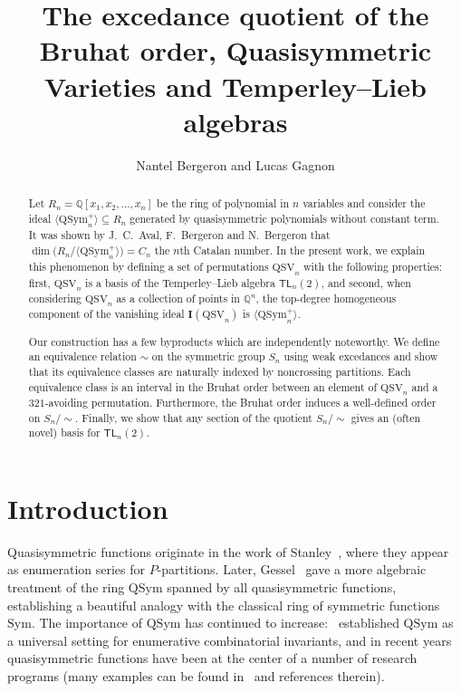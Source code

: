 \documentclass[12pt]{amsart}
\title{The excedance quotient of the Bruhat order, Quasisymmetric Varieties and Temperley--Lieb algebras}
\author{ Nantel Bergeron and Lucas Gagnon}
\date{}
\theoremstyle{definition}
\theoremstyle{remark}
\numberwithin{equation}{section}
\newcommand{\Sym}{\mathrm{Sym}}
\newcommand{\QSym}{\mathrm{QSym}}
\newcommand{\QSV}{\mathrm{QSV}}
\begin{document}
\maketitle
\begin{abstract} 
Let $R_n=\mathbb{Q}[x_1,x_2,\ldots,x_n]$ be the ring of polynomial in $n$ variables and consider the ideal $\langle \mathrm{QSym}_{n}^{+}\rangle\subseteq R_n$ generated by quasisymmetric polynomials without constant term. 
It was shown by J.~C.~Aval, F.~Bergeron and  N.~Bergeron that $\dim\big(R_n\big/\langle \mathrm{QSym}_{n}^{+} \rangle\big)=C_n$ the $n$th Catalan number. 
In the present work, we explain this phenomenon by defining a set of permutations $\mathrm{QSV}_{n}$ with the following properties: first, $\mathrm{QSV}_{n}$ is a basis of the Temperley--Lieb algebra $\mathsf{TL}_{n}(2)$, and second, when considering $\mathrm{QSV}_{n}$ as a collection of points in $\mathbb{Q}^{n}$, the top-degree homogeneous component of the vanishing ideal $\mathbf{I}(\mathrm{QSV}_{n})$ is $\langle \mathrm{QSym}_{n}^{+}\rangle$.

Our construction has a few byproducts which are independently noteworthy.  
We define an equivalence relation $\sim$ on the symmetric group $S_{n}$ using weak excedances and show that its equivalence classes are naturally indexed by noncrossing partitions.  
Each equivalence class is an interval in the Bruhat order between an element of $\mathrm{QSV}_{n}$ and a $321$-avoiding permutation.  
Furthermore, the Bruhat order induces a well-defined order on $S_{n}\big/\!\!\sim$.  
Finally, we show that any section of the quotient $S_{n}\big/\!\!\sim$ gives an (often novel) basis for $\mathsf{TL}_{n}(2)$.  

\end{abstract}

\section{Introduction}

Quasisymmetric functions originate in the work of Stanley~\cite{StanleyQSym}, where they appear as enumeration series for $P$-partitions.  
Later, Gessel~\cite{Gessel} gave a more algebraic treatment of the ring $\QSym$ spanned by all quasisymmetric functions, establishing a beautiful analogy with the classical ring of symmetric functions $\Sym$. 
The importance of $\QSym$ has continued to increase:~\cite{ABS} established $\QSym$ as a universal setting for enumerative combinatorial invariants, and in recent years quasisymmetric functions have been at the center of a number of research programs (many examples can be found in~\cite{Grinberg,LMvW, Mason} and references therein).
\end{document}
